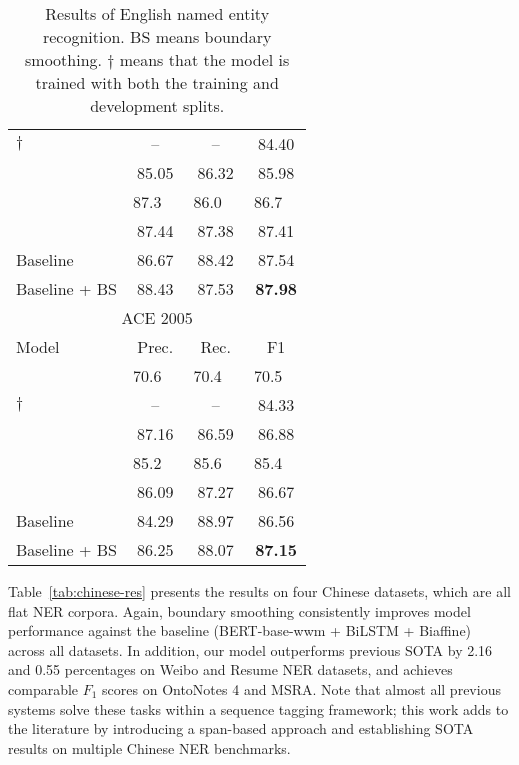 \documentclass[11pt]{article}
\begin{document}
\begin{table}[!ht]
\begin{tabular}{lccc}
        \citet{strakova-etal-2019-neural}$\dagger$ & -- & -- & 84.40 \\
        \citet{li-etal-2020-unified}        & 85.05 & 86.32 & 85.98 \\
        \citet{yu-etal-2020-named}          & 87.3~~ & 86.0~~ & 86.7~~ \\
        \citet{shen-etal-2021-locate}       & 87.44 & 87.38 & 87.41 \\
        Baseline          & 86.67 & 88.42 & 87.54 \\
        Baseline + BS     & 88.43 & 87.53 & \textbf{87.98} \\
        \bottomrule
        \toprule
        \multicolumn{4}{c}{ACE 2005} \\
        \midrule
        Model & Prec. & Rec. & F1 \\
        \midrule
        \citet{katiyar-cardie-2018-nested}  & 70.6~~ & 70.4~~ & 70.5~~ \\
        \citet{strakova-etal-2019-neural}$\dagger$ & -- & -- & 84.33 \\
        \citet{li-etal-2020-unified}        & 87.16 & 86.59 & 86.88 \\
        \citet{yu-etal-2020-named}          & 85.2~~ & 85.6~~ & 85.4~~ \\
        \citet{shen-etal-2021-locate}       & 86.09 & 87.27 & 86.67 \\
        Baseline          & 84.29 & 88.97 & 86.56 \\
        Baseline + BS     & 86.25 & 88.07 & \textbf{87.15} \\
        \bottomrule
    \end{tabular}
    \caption{Results of English named entity recognition. BS means boundary smoothing. $\dagger$ means that the model is trained with both the training and development splits.}
    \label{tab:english-res}
\end{table}


Table~\ref{tab:chinese-res} presents the results on four Chinese datasets, which are all flat NER corpora. Again, boundary smoothing consistently improves model performance against the baseline (BERT-base-wwm + BiLSTM + Biaffine) across all datasets. In addition, our model outperforms previous SOTA by 2.16 and 0.55 percentages on Weibo and Resume NER datasets, and achieves comparable $F_1$ scores on OntoNotes 4 and MSRA. Note that almost all previous systems solve these tasks within a sequence tagging framework; this work adds to the literature by introducing a span-based approach and establishing SOTA results on multiple Chinese NER benchmarks. 
\end{document}
